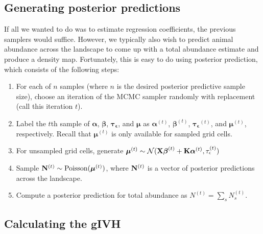 \documentclass[12pt,fleqn]{article}
\begin{document}
\begin{flushleft}
\subsection{Generating posterior predictions}
If all we wanted to do was to estimate regression coefficients, the previous samplers would suffice.  However, we typically also wish to predict animal abundance across the landscape to come up with a total abundance estimate and produce a density map.  Fortunately, this is easy to do using posterior prediction, which consists of the following steps:
\begin{enumerate}
\item For each of $n$ samples (where $n$ is the desired posterior predictive sample size), choose an iteration of the MCMC sampler randomly with replacement (call this iteration $t$).
\item Label the $t$th sample of $\boldsymbol{\alpha}$, $\boldsymbol{\beta}$, $\boldsymbol{\tau_\epsilon}$, and $\boldsymbol{\mu}$ as $\boldsymbol{\alpha}^{(t)}$, $\boldsymbol{\beta}^{(t)}$, $\boldsymbol{\tau_\epsilon}^{(t)}$, and $\boldsymbol{\mu}^{(t)}$, respectively.  Recall that $\boldsymbol{\mu}^{(t)}$ is only available for sampled grid cells.
\item For unsampled grid cells, generate $\boldsymbol{\mu}^{(t)} \sim \mathcal{N}({\bf X}\boldsymbol{\beta}^{(t)}+{\bf K}\boldsymbol{\alpha}^{(t)},\tau_\epsilon^{(t)})$
\item Sample ${\bf N}^{(t)} \sim \text{Poisson}(\boldsymbol{\mu}^{(t)})$, where ${\bf N}^{(t)}$ is a vector of posterior predictions across the landscape.
\item Compute a posterior prediction for total abundance as $N^{(t)}=\sum_s N_s^{(t)}$.
\end{enumerate}

\subsection{Calculating the gIVH}



\end{flushleft}
\end{document}
